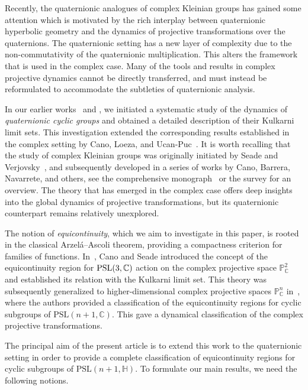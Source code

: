 \documentclass[12pt,reqno]{amsart}
\numberwithin{equation}{section}
\theoremstyle{definition}
\def\C{\mathbb C}
\def\C{\mathbb {C}}
\begin{document}
Recently, the {quaternionic analogues of complex Kleinian groups} has gained some attention which is motivated by the rich interplay between quaternionic hyperbolic geometry and the dynamics of projective transformations over the quaternions. The quaternionic setting has a new layer of complexity due to the non-commutativity of the quaternionic multiplication. This alters the framework that is used in the complex case.  Many of the tools and results in complex projective dynamics cannot be directly transferred, and must instead be reformulated to accommodate the subtleties of quaternionic analysis.

In our earlier works~\cite{dgm} and \cite{dgl},  we initiated a systematic study of the dynamics of \emph{quaternionic cyclic groups} and obtained a detailed description of their Kulkarni limit sets. This investigation extended the corresponding results established in the complex setting by Cano, Loeza, and Ucan-Puc~\cite{cano_main}. It is worth recalling that the study of complex Kleinian groups was originally initiated by Seade and Verjovsky~\cite{sv99, sv01}, and subsequently developed in a series of works by Cano, Barrera, Navarrete, and others, see the comprehensive monograph~\cite{cns} or the survey \cite{ bcnss} for an overview. The theory that has emerged in the complex case offers deep insights into the global dynamics of projective transformations, but its quaternionic counterpart remains relatively unexplored.

The notion of \emph{equicontinuity}, which we aim to investigate in this paper, is rooted in the classical Arzel\'{a}--Ascoli theorem, providing a compactness criterion for families of functions. In~\cite{can}, Cano and Seade 
introduced the concept of the equicontinuity region for ${\rm PSL}(3, \C)$ action on the complex projective space  $\mathbb{P}^2_\mathbb{C}$ and established its relation with the Kulkarni limit set. This theory was subsequently generalized to higher-dimensional complex projective spaces $\mathbb{P}^n_\mathbb{C}$ in~\cite{cano_main}, where the authors provided a classification of the equicontinuity regions for cyclic subgroups of $\mathrm{PSL}(n+1, \mathbb{C})$. This gave a  dynamical classification of the complex projective transformations. 

The principal aim of the present article is to {extend this work to the quaternionic setting} in order to provide a complete classification of equicontinuity regions for cyclic subgroups of $\mathrm{PSL}(n+1, \mathbb{H})$. To formulate our main results, we need the following notions. 
\end{document}
